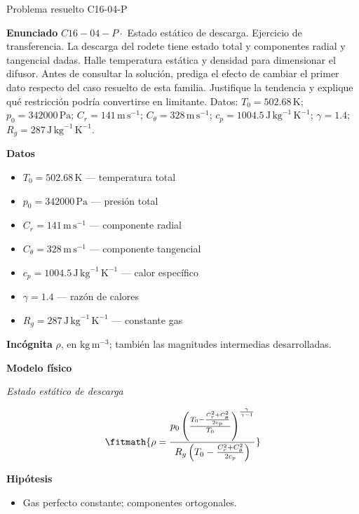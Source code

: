 \documentclass[10pt,openany]{book}
\begin{document}
\begin{studiumworked}{Problema resuelto C16-04-P}


\noindent\textbf{Enunciado}
\(C16-04-P \cdot\) Estado estático de descarga. Ejercicio de transferencia. La descarga del rodete tiene estado total y componentes radial y tangencial dadas. Halle temperatura estática y densidad para dimensionar el difusor. Antes de consultar la solución, prediga el efecto de cambiar el primer dato respecto del caso resuelto de esta familia. Justifique la tendencia y explique qué restricción podría convertirse en limitante. Datos: \(T_0=502.68\, \mathrm{K}\); \(p_0=342000\, \mathrm{Pa}\); \(C_r=141\, \mathrm{m}\,\mathrm{s}^{-1}\); \(C_\theta=328\, \mathrm{m}\,\mathrm{s}^{-1}\); \(c_p=1004.5\, \mathrm{J}\,\mathrm{kg}^{-1}\,\mathrm{K}^{-1}\); \(\gamma=1.4\); \(R_g=287\, \mathrm{J}\,\mathrm{kg}^{-1}\,\mathrm{K}^{-1}\).

\noindent\textbf{Datos}
\begin{itemize}
\item $T_0 = 502.68\,\mathrm{K}$ — temperatura total
\item $p_0 = 342000\,\mathrm{Pa}$ — presión total
\item $C_r = 141\,\mathrm{m}\,\mathrm{s}^{-1}$ — componente radial
\item $C_\theta = 328\,\mathrm{m}\,\mathrm{s}^{-1}$ — componente tangencial
\item $c_p = 1004.5\,\mathrm{J}\,\mathrm{kg}^{-1}\,\mathrm{K}^{-1}$ — calor específico
\item $\gamma = 1.4$ — razón de calores
\item $R_g = 287\,\mathrm{J}\,\mathrm{kg}^{-1}\,\mathrm{K}^{-1}$ — constante gas
\end{itemize}

\noindent\textbf{Incógnita}
$\rho$, en $\mathrm{kg\,m^{-3}}$; también las magnitudes intermedias desarrolladas.

\noindent\textbf{Modelo físico}

\noindent\textit{Estado estático de descarga}

\[
\fitmath{\rho=\frac{p_0 \left(\frac{T_0 - \frac{C_r^{2} + C_\theta^{2}}{2 c_p}}{T_0}\right)^{\frac{\gamma}{\gamma - 1}}}{R_g \left(T_0 - \frac{C_r^{2} + C_\theta^{2}}{2 c_p}\right)}}
\]

\noindent\textbf{Hipótesis}
\begin{itemize}
\item Gas perfecto constante; componentes ortogonales.
\end{itemize}


\end{studiumworked}
\end{document}
